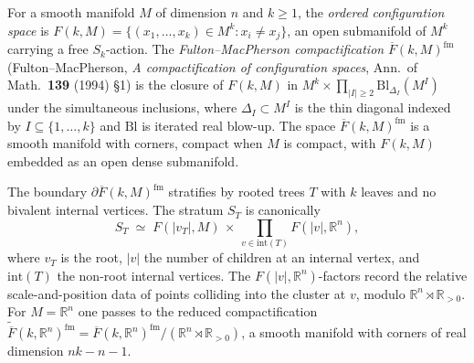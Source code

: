 \providecommand{\FMbar}{\overline{F}}
\providecommand{\FMop}{\mathcal{FM}}
\providecommand{\Gerst}{\mathrm{Gerst}}

\begin{definition}
\label{def:cy-cat-fm-config}
For a smooth manifold $M$ of dimension $n$ and $k \geq 1$, the
\emph{ordered configuration space} is
$F(k, M) = \{(x_1, \ldots, x_k) \in M^k : x_i \neq x_j\}$, an open
submanifold of $M^k$ carrying a free $S_k$-action. The
\emph{Fulton--MacPherson compactification}
$\FMbar(k, M)^{\mathrm{fm}}$ (Fulton--MacPherson, \emph{A compactification of configuration spaces}, Ann.\ of Math.\ \textbf{139} (1994) \S 1) is the closure of
$F(k, M)$ in $M^k \times \prod_{|I| \geq 2} \mathrm{Bl}_{\Delta_I}(M^I)$
under the simultaneous inclusions, where $\Delta_I \subset M^I$ is the
thin diagonal indexed by $I \subseteq \{1, \ldots, k\}$ and
$\mathrm{Bl}$ is iterated real blow-up. The space $\FMbar(k, M)^{\mathrm{fm}}$
is a smooth manifold with corners, compact when $M$ is compact, with
$F(k, M)$ embedded as an open dense submanifold.
\end{definition}

\begin{theorem}
\label{thm:cy-cat-fm-strata}
The boundary $\partial \FMbar(k, M)^{\mathrm{fm}}$ stratifies by rooted trees
$T$ with $k$ leaves and no bivalent internal vertices. The stratum
$S_T$ is canonically
\[
 S_T \;\simeq\; F(|v_T|, M) \,\times\, \prod_{v \in \mathrm{int}(T)} F(|v|, \mathbb{R}^n),
\]
where $v_T$ is the root, $|v|$ the number of children at an internal
vertex, and $\mathrm{int}(T)$ the non-root internal vertices. The
$F(|v|, \mathbb{R}^n)$-factors record the relative scale-and-position
data of points colliding into the cluster at $v$, modulo
$\mathbb{R}^n \rtimes \mathbb{R}_{>0}$. For $M = \mathbb{R}^n$ one
passes to the reduced compactification
$\widetilde{\FMbar}(k, \mathbb{R}^n)^{\mathrm{fm}} =
\FMbar(k, \mathbb{R}^n)^{\mathrm{fm}}/(\mathbb{R}^n \rtimes \mathbb{R}_{>0})$,
a smooth manifold with corners of real dimension $nk - n - 1$.
\end{theorem}

